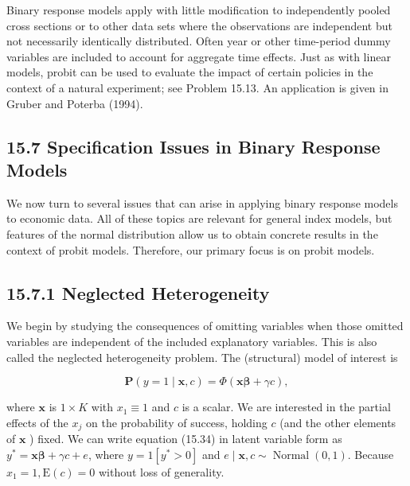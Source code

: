 \documentclass[10pt]{article}
\begin{document}
Binary response models apply with little modification to independently pooled cross sections or to other data sets where the observations are independent but not necessarily identically distributed. Often year or other time-period dummy variables are included to account for aggregate time effects. Just as with linear models, probit can be used to evaluate the impact of certain policies in the context of a natural experiment; see Problem 15.13. An application is given in Gruber and Poterba (1994).

\subsection*{15.7 Specification Issues in Binary Response Models}
We now turn to several issues that can arise in applying binary response models to economic data. All of these topics are relevant for general index models, but features of the normal distribution allow us to obtain concrete results in the context of probit models. Therefore, our primary focus is on probit models.

\subsection*{15.7.1 Neglected Heterogeneity}
We begin by studying the consequences of omitting variables when those omitted variables are independent of the included explanatory variables. This is also called the neglected heterogeneity problem. The (structural) model of interest is


\begin{equation*}
\mathbf{P}(y=1 \mid \mathbf{x}, c)=\Phi(\mathbf{x} \boldsymbol{\beta}+\gamma c), \tag{15.34}
\end{equation*}


where $\mathbf{x}$ is $1 \times K$ with $x_{1} \equiv 1$ and $c$ is a scalar. We are interested in the partial effects of the $x_{j}$ on the probability of success, holding $c$ (and the other elements of $\mathbf{x}$ ) fixed. We can write equation (15.34) in latent variable form as $y^{*}=\mathbf{x} \boldsymbol{\beta}+\gamma c+e$, where $y=1\left[y^{*}>0\right]$ and $e \mid \mathbf{x}, c \sim \operatorname{Normal}(0,1)$. Because $x_{1}=1, \mathrm{E}(c)=0$ without loss of generality.
\end{document}
